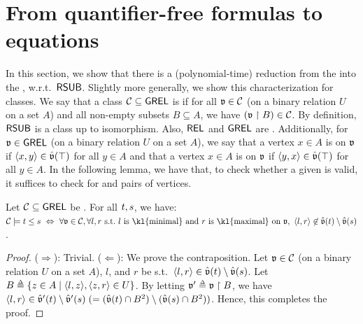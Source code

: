\newcommand{\CSIG}{A}
\newcommand{\model}{\mathfrak{A}}
\newcommand{\struc}{\model}
\newcommand{\ppmodel}{\ddot{\model}}
\newcommand{\jump}[1]{[[#1]]}
\newcommand{\univ}[1]{|#1|}
\newcommand{\CFG}{\mathfrak{C}}
\section{From quantifier-free formulas to equations}\label{section: Schroder-Tarski}
In this section, we show that there is a (polynomial-time) reduction from the  into the , w.r.t.\ $\mathsf{RSUB}$.
Slightly more generally, we show this characterization for \emph{} classes.
We say that a class $\algclass \subseteq \GREL$ is \intro*{} if for all $\val \in \algclass$ (on a binary relation $U$ on a set $A$) and all non-empty subsets $B \subseteq A$, we have $(\val \restriction B) \in \algclass$.
By definition, $\mathsf{RSUB}$ is a  class up to isomorphism.
Also, $\mathsf{REL}$ and $\mathsf{GREL}$ are .
Additionally, for $\mathfrak{v} \in \mathsf{GREL}$ (on a binary relation $U$ on a set $A$),
we say that a vertex $x \in A$ is \intro*{} on $\mathfrak{v}$ if $\langle x, y\rangle \in \hat{\mathfrak{v}}(\top)$ for all $y \in A$
and that a vertex $x \in A$ is \intro*{} on $\mathfrak{v}$ if $\langle y, x\rangle \in \hat{\mathfrak{v}}(\top)$ for all $y \in A$.
In the following lemma, we have that, to check whether a given  is valid, it suffices to check for  and  pairs of vertices.
\begin{lemma}\label{lemma: ORD lr}
    Let $\algclass \subseteq \GREL$ be .
    For all  $\term[1], \term[2]$, we have:
    $\algclass \models \term[1] \le \term[2] \  \Leftrightarrow \  \forall \val \in \algclass, \forall l, r \mbox{ s.t.\ $l$ is \kl{minimal} and $r$ is \kl{maximal} on $\val$},\ \tuple{l, r} \not\in \hat{\val}(\term[1]) \setminus \hat{\val}(\term[2])$.
\end{lemma}
\begin{proof}
    ($\Rightarrow$):
    Trivial.
    ($\Leftarrow$):
    We prove the contraposition.
    Let $\val \in \algclass$ (on a binary relation $U$ on a set $A$), $l$, and $r$ be s.t.\ $\tuple{l, r} \in \hat{\val}(\term[1]) \setminus \hat{\val}(\term[2])$.
    Let $B \defeq \set{z \in A \mid \tuple{l, z}, \tuple{z, r} \in U}$.
    By letting $\val' \defeq \val \restriction B$,
    we have $\tuple{l, r} \in \hat{\val}'(\term[1]) \setminus \hat{\val}'(\term[2]) \mathrel{(=} (\hat{\val}(\term[1]) \cap B^2) \setminus (\hat{\val}(\term[2]) \cap B^2))$.
    Hence, this completes the proof.
\end{proof}

